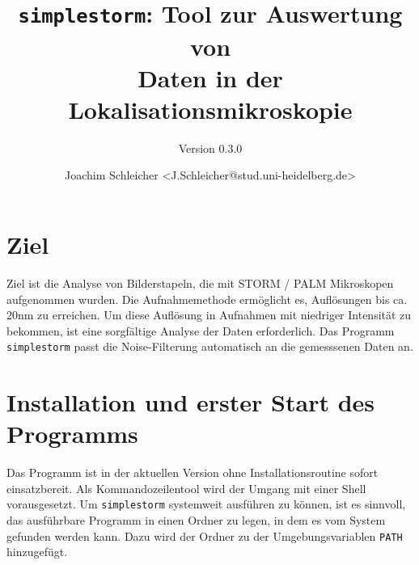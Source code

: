 \documentclass[DIV15,a4paper]{scrartcl}
\begin{document}
\title{\texttt{simplestorm}: Tool zur Auswertung von\\ Daten in der Lokalisationsmikroskopie}
\subtitle{Version 0.3.0}
\author{Joachim Schleicher <J.Schleicher@stud.uni-heidelberg.de>}
\maketitle
\thispagestyle{empty}

\section{Ziel}
Ziel ist die Analyse von Bilderstapeln, die mit STORM / PALM Mikroskopen 
aufgenommen wurden.
Die Aufnahmemethode ermöglicht es, Auflösungen bis ca. 20nm zu erreichen.
Um diese Auflösung in Aufnahmen mit niedriger Intensität zu bekommen, ist
eine sorgfältige Analyse der Daten erforderlich.
Das Programm \texttt{simplestorm} passt die Noise-Filterung automatisch an 
die gemesssenen Daten an. 

\section{Installation und erster Start des Programms}
Das Programm ist in der aktuellen Version ohne Installationsroutine sofort einsatzbereit.
Als Kommandozeilentool wird der Umgang mit einer Shell vorausgesetzt.
Um \texttt{simplestorm} systemweit ausführen zu können, ist es sinnvoll, 
das ausführbare Programm 
in einen Ordner zu legen, in dem es vom System gefunden werden kann.
Dazu wird der Ordner zu der Umgebungsvariablen \texttt{PATH} hinzugefügt.

\end{document}
